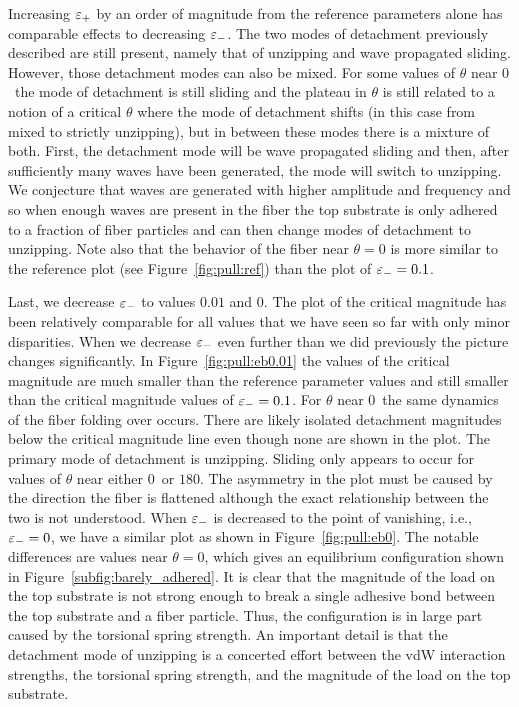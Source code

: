 Increasing $\varepsilon_+$ by an order of magnitude from the reference parameters alone has comparable effects to decreasing $\varepsilon_-$.
The two modes of detachment previously described are still present, namely that of unzipping and wave propagated sliding.
However, those detachment modes can also be mixed. For some values of $\theta$ near $0$\textdegree\ the mode of detachment is still sliding and the plateau in $\theta$ is still related to a notion of a critical $\theta$ where the mode of detachment shifts (in this case from mixed to strictly unzipping), but in between these modes there is a mixture of both.
First, the detachment mode will be wave propagated sliding and then, after sufficiently many waves have been generated, the mode will switch to unzipping.
We conjecture that waves are generated with higher amplitude and frequency and so when enough waves are present in the fiber the top substrate is only adhered to a fraction of fiber particles and can then change modes of detachment to unzipping.
Note also that the behavior of the fiber near $\theta=0$ is more similar to the reference plot (see Figure~\ref{fig:pull:ref}) than the plot of $\varepsilon_-=0.1$.

Last, we decrease $\varepsilon_-$ to values $0.01$ and $0$. The plot of the critical magnitude has been relatively comparable for all values that we have seen so far with only minor disparities. When we decrease $\varepsilon_-$ even further than we did previously the picture changes significantly. In Figure~\ref{fig:pull:eb0.01} the values of the critical magnitude are much smaller than the reference parameter values and still smaller than the critical magnitude values of $\varepsilon_-=0.1$. For $\theta$ near $0$\textdegree\ the same dynamics of the fiber folding over occurs. There are likely isolated detachment magnitudes below the critical magnitude line even though none are shown in the plot. The primary mode of detachment is unzipping. Sliding only appears to occur for values of $\theta$ near either $0$\textdegree\ or $180$\textdegree. The asymmetry in the plot must be caused by the direction the fiber is flattened although the exact relationship between the two is not understood. When $\varepsilon_-$ is decreased to the point of vanishing, i.e., $\varepsilon_-=0$, we have a similar plot as shown in Figure~\ref{fig:pull:eb0}. The notable differences are values near $\theta=0$, which gives an equilibrium configuration shown in Figure~\ref{subfig:barely_adhered}. It is clear that the magnitude of the load on the top substrate is not strong enough to break a single adhesive bond between the top substrate and a fiber particle. Thus, the configuration is in large part caused by the torsional spring strength. An important detail is that the detachment mode of unzipping is a concerted effort between the vdW interaction strengths, the torsional spring strength, and the magnitude of the load on the top substrate.


